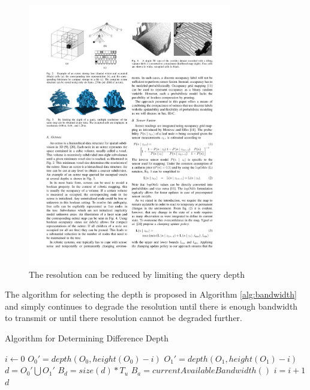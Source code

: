 \documentclass[journal]{IEEEtran}
\begin{document}
  \begin{figure}[here]
    \centering
    \includegraphics[width=3.5in,keepaspectratio]{treedepth.pdf}
    \caption{The resolution can be reduced by limiting the query 
             depth\cite{octomap}}
    \label{fig:treedepth}
  \end{figure}
  
  The algorithm for selecting the depth is proposed in Algorithm
  \ref{alg:bandwidth} and simply continues to degrade the resolution until
  there is enough bandwidth to transmit or until there resolution cannot be
  degraded further.
  
  \begin{algorithm}
  \caption{Algorithm for Determining Difference Depth}
  \label{alg:bandwidth}
  \begin{algorithmic}
    \STATE {}
    \STATE {}
    \STATE {}
    \STATE {}
    \STATE {}
    \STATE {}
    \STATE $i\gets 0$
    \REPEAT
      \STATE $O_0 \prime = depth(O_0,height(O_0)-i)$
      \STATE $O_1 \prime = depth(O_1,height(O_1)-i)$
      \STATE $d = O_0 \prime \bigcup O_1 \prime $
      \STATE $B_d = size(d) * T_u$
      \STATE $B_a = currentAvailableBandwidth()$
      \STATE $i = i + 1$
    \RETURN $d$
  \end{algorithmic}
  \end{algorithm}
  
\end{document}
